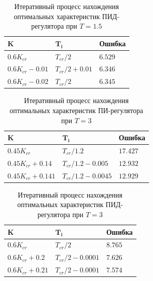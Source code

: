 \bigskip

\begin{table}[h!]
	\centering
	\begin{tabularx}{\textwidth}{
			| >{\arraybackslash}X
			| >{\arraybackslash}X
			| >{\arraybackslash}X
			|}
		\hline
		$\mathbf{K}$ & $\mathbf{T_i}$ & \textbf{Ошибка}\\\hline
		$0.6 K_{cr}$ & $T_{cr} / 2$ & $6.529$\\\hline
		$0.6 K_{cr} - 0.01$ & $T_{cr} / 2 + 0.01$ & $6.346$\\\hline
		$0.6 K_{cr} - 0.02$ & $T_{cr} / 2$ & $6.345$\\\hline
	\end{tabularx}
	\caption{Итеративный процесс нахождения оптимальных характеристик ПИД-регулятора при $T = 1.5$}
\end{table}

\bigskip

\begin{table}[h!]
	\centering
	\begin{tabularx}{\textwidth}{
			| >{\arraybackslash}X
			| >{\arraybackslash}X
			| >{\arraybackslash}X
			|}
		\hline
		$\mathbf{K}$ & $\mathbf{T_i}$ & \textbf{Ошибка}\\\hline
		$0.45 K_{cr}$ & $T_{cr} / 1.2$ & $17.427$\\\hline
		$0.45 K_{cr} + 0.14$ & $T_{cr} / 1.2 - 0.005$ & $12.932$\\\hline
		$0.45 K_{cr} + 0.141$ & $T_{cr} / 1.2 - 0.0045$ & $12.929$\\\hline
	\end{tabularx}
	\caption{Итеративный процесс нахождения оптимальных характеристик ПИ-регулятора при $T = 3$}
\end{table}

\bigskip

\begin{table}[h!]
	\centering
	\begin{tabularx}{\textwidth}{
			| >{\arraybackslash}X
			| >{\arraybackslash}X
			| >{\arraybackslash}X
			|}
		\hline
		$\mathbf{K}$ & $\mathbf{T_i}$ & \textbf{Ошибка} \\\hline
		$0.6 K_{cr}$ & $T_{cr} / 2$ & $8.765$\\\hline
		$0.6 K_{cr} + 0.2$ & $T_{cr} / 2 - 0.0001$ & $7.626$\\\hline
		$0.6 K_{cr} + 0.21$ & $T_{cr} / 2 - 0.0001$ & $7.574$\\\hline
	\end{tabularx}
	\caption{Итеративный процесс нахождения оптимальных характеристик ПИД-регулятора при $T = 3$}
\end{table}
